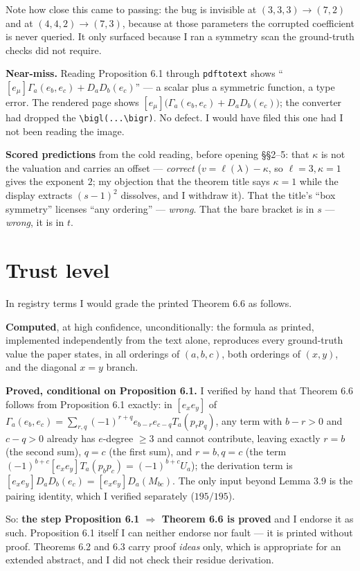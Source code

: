 \documentclass[11pt]{article}
\theoremstyle{definition}
\begin{document}
Note how close this came to passing: the bug is invisible at $(3,3,3)\to(7,2)$ and at
$(4,4,2)\to(7,3)$, because at those parameters the corrupted coefficient is never queried. It
only surfaced because I ran a symmetry scan the ground-truth checks did not require.

\textbf{Near-miss.} Reading Proposition 6.1 through \texttt{pdftotext} shows
``$[e_\mu]\Gamma_a(e_b,e_c)+D_aD_b(e_c)$'' --- a scalar plus a symmetric function, a type error.
The rendered page shows $[e_\mu]\bigl(\Gamma_a(e_b,e_c)+D_aD_b(e_c)\bigr)$; the converter had
dropped the \verb|\bigl(...\bigr)|. No defect. I would have filed this one had I not been
reading the image.

\textbf{Scored predictions} from the cold reading, before opening \S\S2--5: that $\kappa$ is not
the valuation and carries an offset --- \emph{correct} ($v=\ell(\lambda)-\kappa$, so
$\ell=3,\kappa=1$ gives the exponent $2$; my objection that the theorem title says $\kappa=1$
while the display extracts $(s-1)^2$ dissolves, and I withdraw it). That the title's ``box
symmetry'' licenses ``any ordering'' --- \emph{wrong}. That the bare bracket is in $s$ ---
\emph{wrong}, it is in $t$.

\section{Trust level}

In registry terms I would grade the printed Theorem 6.6 as follows.

\textbf{Computed}, at high confidence, unconditionally: the formula as printed, implemented
independently from the text alone, reproduces every ground-truth value the paper states, in all
orderings of $(a,b,c)$, both orderings of $(x,y)$, and the diagonal $x=y$ branch.

\textbf{Proved, conditional on Proposition 6.1.} I verified by hand that Theorem 6.6 follows
from Proposition 6.1 exactly: in $[e_xe_y]$ of
$\Gamma_a(e_b,e_c)=\sum_{r,q}(-1)^{r+q}e_{b-r}e_{c-q}T_a(p_rp_q)$, any term with
$b-r>0$ and $c-q>0$ already has $e$-degree $\ge3$ and cannot contribute, leaving exactly
$r=b$ (the second sum), $q=c$ (the first sum), and $r=b,q=c$ (the term
$(-1)^{b+c}[e_xe_y]T_a(p_bp_c)=(-1)^{b+c}U_a$); the derivation term is
$[e_xe_y]D_aD_b(e_c)=[e_xe_y]D_a(M_{bc})$. The only input beyond Lemma 3.9 is the pairing
identity, which I verified separately ($195/195$).

So: \textbf{the step Proposition 6.1 $\Rightarrow$ Theorem 6.6 is proved} and I endorse it as
such. Proposition 6.1 itself I can neither endorse nor fault --- it is printed without proof.
Theorems 6.2 and 6.3 carry proof \emph{ideas} only, which is appropriate for an extended
abstract, and I did not check their residue derivation.
\end{document}
